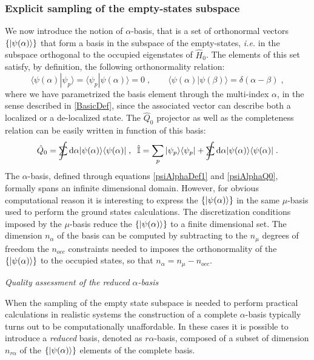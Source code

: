 \documentclass[a4paper]{article}
\newcommand{\dd}{{\rm d}}
\newcommand{\sint}{\mathrlap{\displaystyle\int}
\mathrlap{\textstyle\sum}
\phantom{\mathrlap{\displaystyle
\int}\textstyle\sum}}
\newcommand{\be}{\begin{equation}}
\newcommand{\ee}{\end{equation}}
\newcommand{\qq}{\qquad}
\newcommand{\lb}{\label}
\newcommand{\op}[1]{\hat {#1}}
\newcommand{\brket}[2]{\langle  #1 | #2 \rangle} %
\newcommand{\ketbra}[2]{| #1 \rangle \langle #2 |}
\newcommand{\hnot}{\op{H}_0}
\newcommand{\identity}{\op{\mathbb I}}
\begin{document}
\subsubsection{Explicit sampling of the empty-states subspace}

We now introduce the notion of $\alpha$-basis, that is a set of orthonormal vectors $\{\ket{\psi(\alpha)}\}$ that form a basis in the subspace of the empty-states, \emph{i.e.} in the subspace 
orthogonal to the occupied eigenstates of $\hnot$. The elements of this set satisfy, by definition, the following orthonormality relation: 
\be\lb{psiAlphaDef1}
\brket{\psi(\alpha)}{\psi_p} = \brket{\psi_p}{\psi(\alpha)} = 0 \;, \qq
\brket{\psi(\alpha)}{\psi(\beta)} = \delta(\alpha-\beta) \;,
\ee
where we have parametrized the basis element through the multi-index $\alpha$, in the sense described in \ref{BasicDef}, since the associated vector can describe both a localized or a 
de-localized state. The $\op Q_0$ projector as well as the completeness relation can be easily written in function of this basis: 
\be\lb{psiAlphaQ0}
\op Q_0 = \sint\dd\alpha\ketbra{\psi(\alpha)}{\psi(\alpha)} \;, \;\; 
\identity = \sum_p\ketbra{\psi_p}{\psi_p} + \sint\dd\alpha\ketbra{\psi(\alpha)}{\psi(\alpha)} \;.
\ee
The $\alpha$-basis, defined through equations \eqref{psiAlphaDef1} and \eqref{psiAlphaQ0}, formally spans an infinite dimensional domain. However, for obvious computational reason it is 
interesting to express the $\{\ket{\psi(\alpha)}\}$ in the same $\mu$-basis used to perform the ground states calculations. The discretization conditions imposed by the $\mu$-basis reduce 
the $\{\ket{\psi(\alpha)}\}$ to a finite dimensional set. The dimension $n_\alpha$ of the basis can be computed by subtracting to the $n_\mu$ degrees of freedom the $n_{occ}$ constraints 
needed to imposes the orthonormality of the $\{\ket{\psi(\alpha)}\}$ to the occupied states, so that $n_\alpha=n_\mu-n_{occ}$.

\vspace{0.4cm}
\emph{Quality assessment of the reduced $\alpha$-basis}
\vspace{0.4cm}

When the sampling of the empty state subspace is needed to perform practical calculations in realistic systems the construction of a complete $\alpha$-basis typically turns out to be 
computationally unaffordable. In these cases it is possible to introduce a \emph{reduced} basis, denoted as $r\alpha$-basis, composed of a subset of dimension $n_{r\alpha}$ of the 
$\{\ket{\psi(\alpha)}\}$ elements of the complete basis. 
\end{document}
